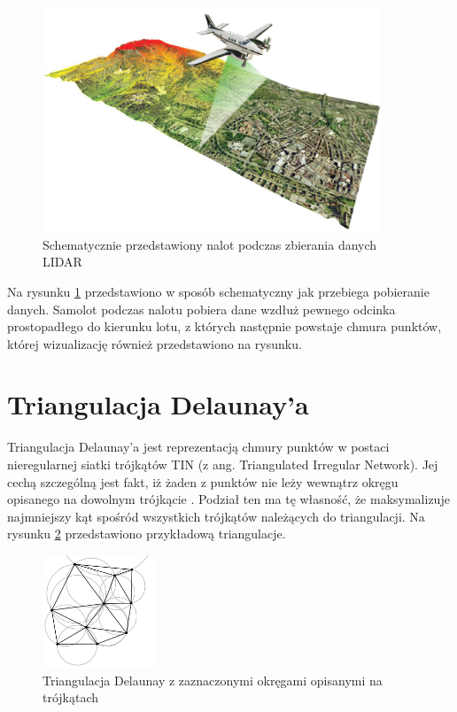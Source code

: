\begin{figure}[h!]
\centering
\includegraphics[width=0.9\textwidth]{img/LIDAR.jpg}
\caption{Schematycznie przedstawiony nalot podczas zbierania danych LIDAR}
\label{fig:lidar}
\end{figure}

Na rysunku \ref{fig:lidar} przedstawiono w sposób schematyczny jak przebiega pobieranie danych. Samolot podczas nalotu pobiera dane wzdłuż pewnego odcinka prostopadłego do kierunku lotu, z których następnie powstaje chmura punktów, której wizualizację również przedstawiono na rysunku.

\section{Triangulacja Delaunay'a}

Triangulacja Delaunay'a jest reprezentacją chmury punktów w postaci nieregularnej siatki trójkątów TIN (z ang. Triangulated Irregular Network).
Jej cechą szczególną jest fakt, iż żaden z punktów nie leży wewnątrz okręgu opisanego na dowolnym trójkącie \cite{Lee1980}. Podział ten ma tę własność, że maksymalizuje najmniejszy kąt spośród 
wszystkich trójkątów należących do triangulacji. Na rysunku \ref{fig:triangulacja} przedstawiono przykładową triangulacje.

\begin{figure}[h!]
    \centering
    \includegraphics[width=0.3\textwidth]{img/triangulacja.jpg}
    \caption{Triangulacja Delaunay z zaznaczonymi okręgami opisanymi na trójkątach}
    \label{fig:triangulacja}
\end{figure}

